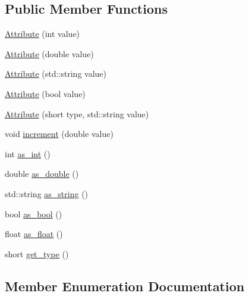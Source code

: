 \subsection*{Public Member Functions}
\begin{DoxyCompactItemize}
\item 
\hyperlink{class_zamasu_1_1_attribute_aa22cd1d065caca7f220e37cfe51b1eab}{Attribute} (int value)
\item 
\hyperlink{class_zamasu_1_1_attribute_abf50a9d775fd10dc49b03532a9aa7bfa}{Attribute} (double value)
\item 
\hyperlink{class_zamasu_1_1_attribute_ad821e11f8bb7e24b3a0b3d951c41094c}{Attribute} (std\+::string value)
\item 
\hyperlink{class_zamasu_1_1_attribute_a33e8929adb0f75c56df0c89302c23249}{Attribute} (bool value)
\item 
\hyperlink{class_zamasu_1_1_attribute_a4ceeeb4004160605c99abcf700d96928}{Attribute} (short type, std\+::string value)
\item 
void \hyperlink{class_zamasu_1_1_attribute_a48f40386ca09c234d88cfe88aa2bb914}{increment} (double value)
\item 
int \hyperlink{class_zamasu_1_1_attribute_ae580f74cccac946ceaefd5b289d73025}{as\+\_\+int} ()
\item 
double \hyperlink{class_zamasu_1_1_attribute_ab2c5039cdacb5bce0166d4d1d61eb88e}{as\+\_\+double} ()
\item 
std\+::string \hyperlink{class_zamasu_1_1_attribute_a57ebc90b4432fbeaee2f248715d2c2fd}{as\+\_\+string} ()
\item 
bool \hyperlink{class_zamasu_1_1_attribute_afb353fef17d94b6cbfbc9b0f1601495b}{as\+\_\+bool} ()
\item 
float \hyperlink{class_zamasu_1_1_attribute_a75c595902bd807eb345af6530e5e8553}{as\+\_\+float} ()
\item 
short \hyperlink{class_zamasu_1_1_attribute_a9368fff8eb63cdd0aa626624ac61b2aa}{get\+\_\+type} ()
\end{DoxyCompactItemize}


\subsection{Member Enumeration Documentation}
